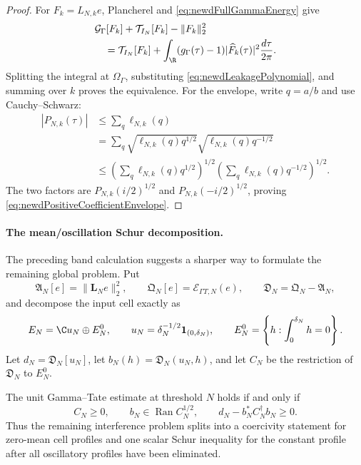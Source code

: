 \begin{proof}
For $F_k=L_{N,k}e$, Plancherel and
\eqref{eq:newdFullGammaEnergy} give
\begin{align*}
 &\mathcal G_\Gamma[F_k]+\mathcal T_{I_N}[F_k]-\|F_k\|_2^2\\
 &\quad=\mathcal T_{I_N}[F_k]
 +\int_\R(g_\Gamma(\tau)-1)|\widehat F_k(\tau)|^2
          \frac{d\tau}{2\pi}.
\end{align*}
Splitting the integral at $\Omega_\Gamma$, substituting
\eqref{eq:newdLeakagePolynomial}, and summing over $k$ proves the
equivalence.  For the envelope, write $q=a/b$ and use Cauchy--Schwarz:
\begin{align*}
 |P_{N,k}(\tau)|
 &\leq\sum_q\ell_{N,k}(q)\\
 &=\sum_q
   \sqrt{\ell_{N,k}(q)q^{1/2}}
   \sqrt{\ell_{N,k}(q)q^{-1/2}}\\
 &\leq
 \left(\sum_q\ell_{N,k}(q)q^{1/2}\right)^{1/2}
 \left(\sum_q\ell_{N,k}(q)q^{-1/2}\right)^{1/2}.
\end{align*}
The two factors are $P_{N,k}(i/2)^{1/2}$ and
$P_{N,k}(-i/2)^{1/2}$, proving
\eqref{eq:newdPositiveCoefficientEnvelope}.
\end{proof}

\paragraph{The mean/oscillation Schur decomposition.}
The preceding band calculation suggests a sharper way to formulate the
remaining global problem.  Put
\[
 \mathfrak A_N[e]=\|\mathbf L_Ne\|_2^2,
 \qquad
 \mathfrak Q_N[e]=\mathcal E_{\Gamma T,N}(e),
 \qquad
 \mathfrak D_N=\mathfrak Q_N-\mathfrak A_N,
\]
and decompose the input cell exactly as
\begin{equation}\label{eq:newdMeanZeroSplit}
 E_N=\C u_N\oplus E_N^0,
 \qquad
 u_N=\delta_N^{-1/2}\mathbf1_{(0,\delta_N)},
 \qquad
 E_N^0=\left\{h:\int_0^{\delta_N}h=0\right\}.
\end{equation}
Let $d_N=\mathfrak D_N[u_N]$, let
$b_N(h)=\mathfrak D_N(u_N,h)$, and let $C_N$ be the restriction of
$\mathfrak D_N$ to $E_N^0$.

\begin{proposition}
\label{prop:newdMeanZeroSchur}
The unit Gamma--Tate estimate at threshold $N$ holds if and only if
\begin{equation}\label{eq:newdMeanZeroSchurCriterion}
 C_N\geq0,
 \qquad
 b_N\in\operatorname{Ran}C_N^{1/2},
 \qquad
 d_N-b_N^*C_N^\dagger b_N\geq0.
\end{equation}
Thus the remaining interference problem splits into a coercivity statement
for zero-mean cell profiles and one scalar Schur inequality for the constant
profile after all oscillatory profiles have been eliminated.
\end{proposition}

